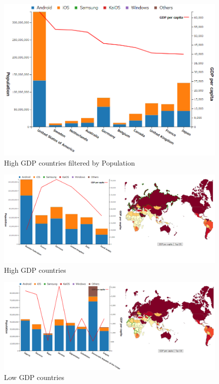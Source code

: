 \documentclass[12pt, a4paper]{jarticle}
\begin{document}
\begin{figure}[H]
  \centering
  \includegraphics[keepaspectratio, scale=0.6]{imgs/bar_filter.png}
  \caption{High GDP countries filtered by Population}
  \label{fig:bar_filter}
\end{figure}

\begin{figure}[H]
  \centering
  \includegraphics[keepaspectratio, scale=0.33]{imgs/high_gdp.png}
  \caption{High GDP countries}
  \label{fig:high_gdp}
\end{figure}

\begin{figure}[H]
  \centering
  \includegraphics[keepaspectratio, scale=0.3]{imgs/low_gdp.png}
  \caption{Low GDP countries}
  \label{fig:low_gdp}
\end{figure}
\end{document}
